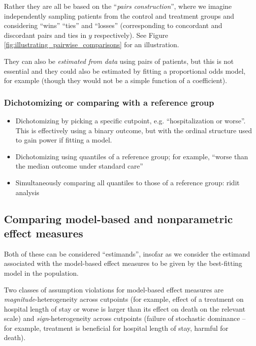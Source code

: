 \documentclass[
  11pt,
  fleqn
]{article}
\begin{document}
Rather they are all be based on the ``\emph{pairs construction}'',
where we imagine independently sampling patients from the control and
treatment groups and considering ``wins'' ``ties'' and ``losses''
(corresponding to concordant and discordant pairs and ties in $y$
respectively). See Figure \ref{fig:illustrating_pairwise_comparisons}
for an illustration.

They can
also be \emph{estimated from data} using pairs of patients, but this
is not essential and they could also be estimated by fitting a
proportional odds model, for example (though they would not be a
simple function of a coefficient).

\subsubsection{Dichotomizing or comparing with a reference group}

\begin{itemize}
  \item Dichotomizing by picking a specific cutpoint,
    e.g. ``hospitalization or
    worse''. This is effectively using a binary outcome, but with the
    ordinal structure used to gain power if fitting a model.
  \item Dichotomizing using quantiles of a reference
    group; for example,
    ``worse than the median outcome under standard care''
  \item Simultaneously comparing all quantiles to those of a
    reference group: ridit analysis
    \citep{brossHowUseRidit1958,agrestiAnalysisOrdinalCategorical2010,
      smithsonReceiverOperatingCharacteristic2023,
    jansenRiditAnalysisReview1984}
\end{itemize}

\subsection{Comparing model-based and nonparametric effect measures}

Both of these can be considered ``estimands'', insofar as we consider the
estimand associated with the model-based effect measures to be given by the
best-fitting model in the population.

Two classes of assumption violations for model-based effect measures
are \emph{magnitude}-heterogeneity across cutpoints (for example,
  effect of a treatment on hospital length of stay or worse is larger
  than its effect on
death on the relevant scale) and
\emph{sign}-heterogeneity
across cutpoints (failure of stochastic dominance -- for example,
treatment is beneficial for hospital length of stay, harmful for death).
\end{document}
